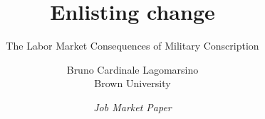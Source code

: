 \documentclass{beamer}
\title{Enlisting change}
\subtitle{The Labor Market Consequences of Military Conscription}
\author{\small Bruno Cardinale Lagomarsino \\ Brown University}
\date{\footnotesize \textit{Job Market Paper}}
\begin{document}
\frame{\titlepage}
\end{document}
